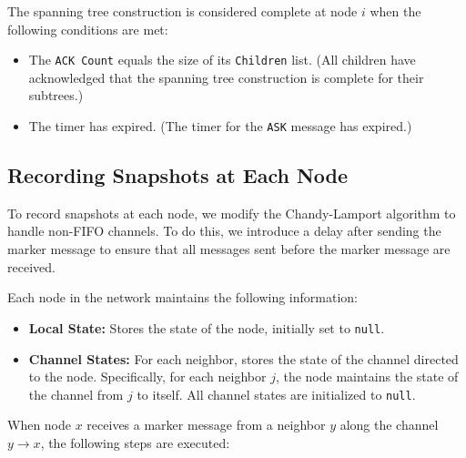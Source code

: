 The spanning tree construction is considered complete at node \(i\) when the following conditions are met:
\begin{itemize}
    \item The \texttt{ACK Count} equals the size of its \texttt{Children} list. (All children have acknowledged that the spanning tree construction is complete for their subtrees.)
    \item The timer has expired. (The timer for the \texttt{ASK} message has expired.)
\end{itemize}

\subsection{Recording Snapshots at Each Node}

To record snapshots at each node, we modify the Chandy-Lamport algorithm to handle non-FIFO channels. To do this, we introduce a delay after sending the marker message to ensure that all messages sent before the marker message are received.

Each node in the network maintains the following information:

\begin{itemize}
    \item \textbf{Local State:} Stores the state of the node, initially set to \texttt{null}.
    \item \textbf{Channel States:} For each neighbor, stores the state of the channel directed to the node. Specifically, for each neighbor \(j\), the node maintains the state of the channel from \(j\) to itself. All channel states are initialized to \texttt{null}.
\end{itemize}

When node \(x\) receives a marker message from a neighbor \(y\) along the channel \(y \rightarrow x\), the following steps are executed:


